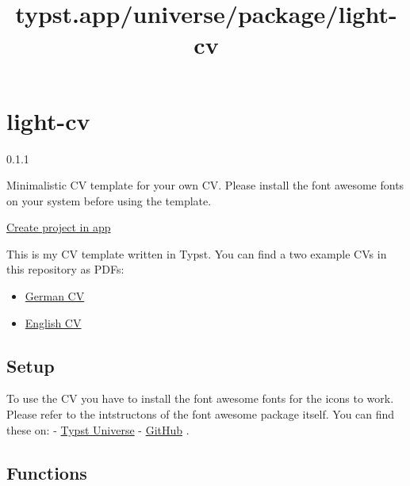 \title{typst.app/universe/package/light-cv}

\label{banner}
\label{template-thumbnail}

\section{light-cv}\label{light-cv}

{ 0.1.1 }

Minimalistic CV template for your own CV. Please install the font
awesome fonts on your system before using the template.

\href{/app?template=light-cv&version=0.1.1}{Create project in app}

\label{readme}
This is my CV template written in Typst. You can find a two example CVs
in this repository as PDFs:

\begin{itemize}
\tightlist
\item
  \href{https://github.com/AnsgarLichter/light-cv/blob/main/cv-de.pdf}{German
  CV}
\item
  \href{https://github.com/AnsgarLichter/light-cv/blob/main/cv-en.pdf}{English
  CV}
\end{itemize}

\subsection{Setup}\label{setup}

To use the CV you have to install the font awesome fonts for the icons
to work. Please refer to the intstructons of the font awesome package
itself. You can find these on: -
\href{https://typst.app/universe/package/fontawesome}{Typst Universe} -
\href{https://github.com/duskmoon314/typst-fontawesome}{GitHub} .

\subsection{Functions}\label{functions}

